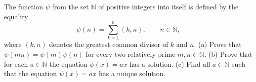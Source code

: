 The function $\psi$ from the set $\mathbb{N}$ of positive integers into itself is defined by the equality
\[
\psi(n) = \sum_{k=1}^{n} (k, n), \qquad n \in \mathbb{N},
\]
where $(k, n)$ denotes the greatest common divisor of $k$ and $n$.
(a) Prove that $\psi(mn) = \psi(m)\psi(n)$ for every two relatively prime $m, n \in \mathbb{N}$.
(b) Prove that for each $a \in \mathbb{N}$ the equation $\psi(x) = ax$ has a solution.
(c) Find all $a \in \mathbb{N}$ such that the equation $\psi(x) = ax$ has a unique solution.

